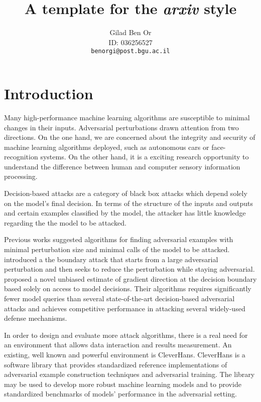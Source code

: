 \documentclass{article}
\title{A template for the \emph{arxiv} style}
\author{
  Gilad Ben Or\\
  ID: 036256527\\
  \texttt{benorgi@post.bgu.ac.il} \\
  }
\begin{document}
\maketitle

\begin{abstract}
\lipsum[1]
\end{abstract}




\section{Introduction}
Many high-performance machine learning algorithms are susceptible to minimal changes in their inputs. Adversarial perturbations drawn attention from two directions. On the one hand, we are concerned about the integrity and security of machine learning algorithms deployed, such as autonomous cars or face-recognition systems. On the other hand, it is a exciting research opportunity to understand the difference between human and computer sensory information processing.

Decision-based attacks are a category of black box attacks which depend solely on the model's final decision. In terms of the structure of the inputs and outputs and certain examples classified by the model, the attacker has little knowledge regarding the  the model to be attacked.

Previous works suggested algorithms for finding adversarial examples with minimal perturbation size and minimal calls of the model to be attacked. \cite{brendel2017decision} introduced a the boundary attack that starts from a large adversarial perturbation and then seeks to reduce the perturbation while staying adversarial. \cite{chen2019hopskipjumpattack} proposed a novel unbiased estimate of gradient direction at the decision boundary based solely on access to model decisions. Their algorithms requires significantly fewer model queries than several state-of-the-art decision-based adversarial attacks and achieves competitive performance in attacking several widely-used defense mechanisms.

In order to design and evaluate more attack algorithms, there is a real need for an environment that allows data interaction and results measurement. An existing, well known and powerful environment is CleverHans. CleverHans \cite{papernot2018cleverhans} is a software library that provides standardized reference implementations of adversarial example construction techniques and adversarial training. The library may be used to develop more robust machine learning models and to provide standardized benchmarks of models' performance in the adversarial setting. 
\end{document}
